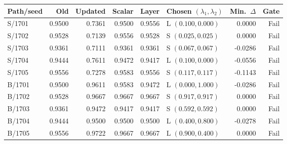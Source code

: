 \begin{tabular}{lrrrrlrr}
\toprule
Path/seed & Old & Updated & Scalar & Layer & Chosen $(\lambda_1,\lambda_2)$ & Min.\ $\Delta$ & Gate \\
\midrule
S/1701 & 0.9500 & 0.7361 & 0.9500 & 0.9556 & L $(0.100,0.000)$ & 0.0000 & Fail \\
S/1702 & 0.9528 & 0.7139 & 0.9556 & 0.9528 & S $(0.025,0.025)$ & 0.0000 & Fail \\
S/1703 & 0.9361 & 0.7111 & 0.9361 & 0.9361 & S $(0.067,0.067)$ & -0.0286 & Fail \\
S/1704 & 0.9444 & 0.7611 & 0.9472 & 0.9417 & L $(0.100,0.000)$ & -0.0556 & Fail \\
S/1705 & 0.9556 & 0.7278 & 0.9583 & 0.9556 & S $(0.117,0.117)$ & -0.1143 & Fail \\
\midrule
B/1701 & 0.9500 & 0.9611 & 0.9583 & 0.9472 & L $(0.000,1.000)$ & -0.0286 & Fail \\
B/1702 & 0.9528 & 0.9667 & 0.9667 & 0.9667 & S $(0.917,0.917)$ & 0.0000 & Fail \\
B/1703 & 0.9361 & 0.9472 & 0.9417 & 0.9417 & S $(0.592,0.592)$ & 0.0000 & Fail \\
B/1704 & 0.9444 & 0.9500 & 0.9500 & 0.9500 & L $(0.400,0.800)$ & -0.0278 & Fail \\
B/1705 & 0.9556 & 0.9722 & 0.9667 & 0.9667 & L $(0.900,0.400)$ & 0.0000 & Fail \\
\bottomrule
\end{tabular}
